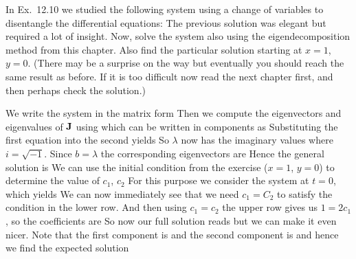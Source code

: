 In Ex.~12.10 we studied the following system using a change of variables to disentangle the differential equations:
The previous solution was elegant but required a lot of insight. Now, solve the system also using the eigendecomposition method from this chapter. Also find the particular solution starting at $x=1$, $y=0$. (There may be a surprise on the way but eventually you should reach the same result as before. If it is too difficult now read the next chapter first, and then perhaps check the solution.) 

\solution

We write the system in the matrix form 
Then we compute the eigenvectors and eigenvalues of $\bf J$ using 
which can be written in components as 
Substituting the first equation into the second yields 
So $\lambda$ now has the imaginary values 
where $i=\sqrt{-1}$. Since $b=\lambda$ the corresponding eigenvectors are
Hence the general solution is 
We can use the initial condition from the exercise ($x=1$, $y=0$) to determine the value of $c_1$, $c_2$ For this purpose we consider the system at $t=0$, which yields 
We can now immediately see that we need $c_1 = C_2$ to satisfy the condition in the lower row. And then using $c_1=c_2$ the upper row gives us $1=2c_1$, so the coefficients are 
So now our full solution reads 
but we can make it even nicer. Note that the first component is 
and the second component is 
and hence we find the expected solution 





